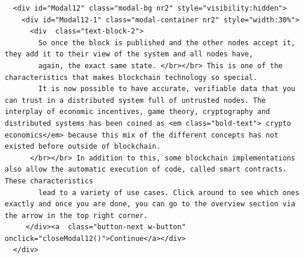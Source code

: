 \begin{lstlisting}
  <div id="Modal12" class="modal-bg nr2" style="visibility:hidden">
    <div id="Modal12-1" class="modal-container nr2" style="width:30%">
      <div  class="text-block-2">
        So once the block is published and the other nodes accept it, they add it to their view of the system and all nodes have,
        again, the exact same state. </br></br> This is one of the characteristics that makes blockchain technology so special.
        It is now possible to have accurate, verifiable data that you can trust in a distributed system full of untrusted nodes. The interplay of economic incentives, game theory, cryptography and distributed systems has been coined as <em class="bold-text"> crypto economics</em> because this mix of the different concepts has not existed before outside of blockchain. 
      </br></br> In addition to this, some blockchain implementations also allow the automatic execution of code, called smart contracts. These characteristics
        lead to a variety of use cases. Click around to see which ones exactly and once you are done, you can go to the overview section via the arrow in the top right corner.
     </div><a  class="button-next w-button" onclick="closeModal12()">Continue</a></div>
  </div>


\end{lstlisting}
